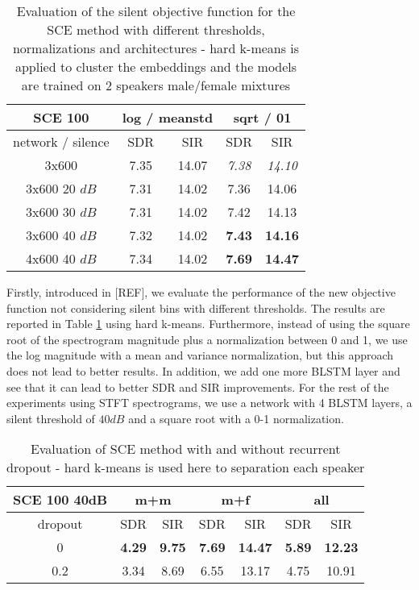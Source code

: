 \documentclass[master,final,11pt]{iscs-thesis}
\begin{document}
\begin{table}[ht]
\centering
\begin{tabular}{c|c|c|c|c}
SCE 100 & \multicolumn{2}{c|}{log / meanstd } & \multicolumn{2}{c}{sqrt / 01} \\ 
\hline 
network / silence & SDR & SIR & SDR & SIR  \\ 
\hline 
3x600 & 7.35 & 14.07 & \textit{7.38} & \textit{14.10} \\ 
\hline 
\hline 
3x600 20 $dB$ & 7.31 & 14.02 & 7.36 & 14.06 \\ 
3x600 30 $dB$ & 7.31 & 14.02 & 7.42 & 14.13 \\ 
3x600 40 $dB$ & 7.32 & 14.02 & \textbf{7.43} & \textbf{14.16} \\ 
4x600 40 $dB$ & 7.34 & 14.02 & \cellcolor{green}\textbf{7.69} & \cellcolor{green}\textbf{14.47} \\ 
\end{tabular}
\captionsetup{justification=centering}
\caption{Evaluation of the silent objective function for the SCE method with different thresholds, normalizations and architectures - hard k-means is applied to cluster the embeddings and the models are trained on 2 speakers male/female mixtures}
\label{table:SCEsilence}
\end{table}

Firstly, introduced in [REF], we evaluate the performance of the new objective function not considering silent bins with different thresholds. The results are reported in Table \ref{table:SCEsilence} using hard k-means. Furthermore, instead of using the square root of the spectrogram magnitude plus a normalization between 0 and 1, we use the log magnitude with a mean and variance normalization, but this approach does not lead to better results. In addition, we add one more BLSTM layer and see that it can lead to better SDR and SIR improvements. For the rest of the experiments using STFT spectrograms, we use a network with 4 BLSTM layers, a silent threshold of $40dB$ and a square root with a 0-1 normalization. 

\begin{table}[ht]
\centering
\begin{tabular}{c|c|c|c|c|c|c}
SCE 100 40dB & \multicolumn{2}{c|}{m+m} & \multicolumn{2}{c|}{m+f} & \multicolumn{2}{c}{all} \\ 
\hline 
dropout & SDR & SIR & SDR & SIR & SDR & SIR  \\ 
\hline 
0 & \textbf{4.29} & \textbf{9.75} & \textbf{7.69} & \textbf{14.47} & \textbf{5.89} & \textbf{12.23} \\ 
0.2 & 3.34 & 8.69 &  6.55 & 13.17 & 4.75 & 10.91 \\ 
\end{tabular}
\captionsetup{justification=centering}
\caption{Evaluation of SCE method with and without recurrent dropout - hard k-means is used here to separation each speaker}
\label{table:SCE100drop}
\end{table}
\end{document}
